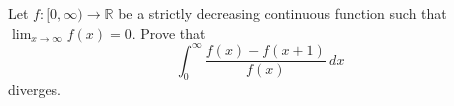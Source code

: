 Let $f \colon [0,\infty) \to \mathbb{R}$ be a strictly decreasing continuous function such that $\lim_{x\to\infty} f(x) = 0$.
Prove that \[\int_0^\infty \frac{f(x)-f(x+1)}{f(x)}\,dx\] diverges.
